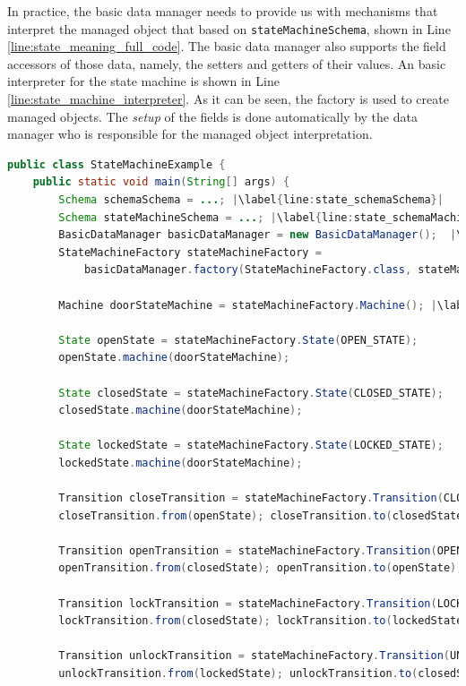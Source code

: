 In practice, the basic data manager needs to provide us with mechanisms that interpret the managed object that based on \texttt{stateMachineSchema}, shown in Line \ref{line:state_meaning_full_code}.
The basic data manager  also supports the field accessors of those data, namely, the setters and getters of their values.
An basic interpreter for the state machine is shown in Line \ref{line:state_machine_interpreter}.
As it can be seen, the factory is used to create managed objects.
The \textit{setup} of the fields is done automatically by the data manager who is responsible for the managed object interpretation.

\begin{sourcecode}
	\begin{lstlisting}[language=Java, escapechar=|]
public class StateMachineExample {
	public static void main(String[] args) {
		Schema schemaSchema = ...; |\label{line:state_schemaSchema}|
		Schema stateMachineSchema = ...; |\label{line:state_schemaMachineSchema}|
		BasicDataManager basicDataManager = new BasicDataManager();  |\label{line:state_meaning_full_code}|
		StateMachineFactory stateMachineFactory = 
			basicDataManager.factory(StateMachineFactory.class, stateMachineSchema);

		Machine doorStateMachine = stateMachineFactory.Machine(); |\label{line:state_machine_creation_basic}|

		State openState = stateMachineFactory.State(OPEN_STATE);
		openState.machine(doorStateMachine);

		State closedState = stateMachineFactory.State(CLOSED_STATE);
		closedState.machine(doorStateMachine);

		State lockedState = stateMachineFactory.State(LOCKED_STATE);
		lockedState.machine(doorStateMachine);

		Transition closeTransition = stateMachineFactory.Transition(CLOSE_TRANSITION);
		closeTransition.from(openState); closeTransition.to(closedState);

		Transition openTransition = stateMachineFactory.Transition(OPEN_TRANSITION);
		openTransition.from(closedState); openTransition.to(openState);

		Transition lockTransition = stateMachineFactory.Transition(LOCK_TRANSITION);
		lockTransition.from(closedState); lockTransition.to(lockedState);

		Transition unlockTransition = stateMachineFactory.Transition(UNLOCK_TRANSITION);
		unlockTransition.from(lockedState); unlockTransition.to(closedState);


\end{lstlisting}
\end{sourcecode}
